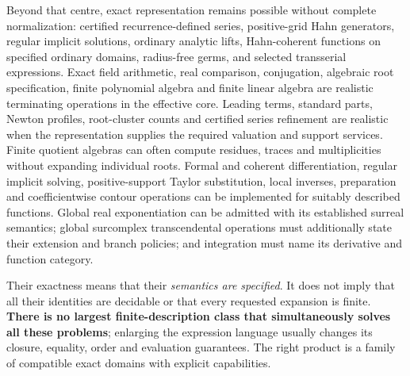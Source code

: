 \documentclass[11pt,letterpaper]{article}
\numberwithin{equation}{section}
\theoremstyle{definition}
\theoremstyle{remark}
\begin{document}
Beyond that centre, exact representation remains possible without complete
normalization: certified recurrence-defined series, positive-grid Hahn
generators, regular implicit solutions, ordinary analytic lifts, Hahn-coherent
functions on specified ordinary domains, radius-free germs, and selected
transserial expressions. Exact field arithmetic, real comparison, conjugation,
algebraic root specification, finite polynomial algebra and finite linear
algebra are realistic terminating operations in the effective core. Leading
terms, standard parts, Newton profiles, root-cluster counts and certified series
refinement are realistic when the representation supplies the required valuation
and support services. Finite quotient algebras can often compute residues,
traces and multiplicities without expanding individual roots. Formal and
coherent differentiation, regular implicit solving, positive-support Taylor
substitution, local inverses, preparation and coefficientwise contour operations
can be implemented for suitably described functions. Global real exponentiation
can be admitted with its established surreal semantics; global surcomplex
transcendental operations must additionally state their extension and branch
policies; and integration must name its derivative and function category.

Their exactness means that their \emph{semantics are specified}. It does not
imply that all their identities are decidable or that every requested expansion
is finite. \textbf{There is no largest finite-description class that
simultaneously solves all these problems}; enlarging the expression language
usually changes its closure, equality, order and evaluation guarantees. The
right product is a family of compatible exact domains with explicit
capabilities.
\end{document}
